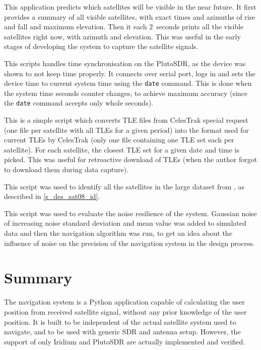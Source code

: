  This application predicts which satellites will be visible in the near future. It first provides a summary of all visible satellites, with exact times and azimuths of rise and fall and maximum elevation. Then it each \qty{2}{seconds} prints all the visible satellites right now, with azimuth and elevation. This was useful in the early stages of developing the system to capture the satellite signals.

 This scripts handles time synchronisation on the PlutoSDR, as the device was shown to not keep time properly. It connects over serial port, logs in and sets the device time to current system time using the \texttt{date} command. This is done when the system time seconds counter changes, to achieve maximum accuracy (since the \texttt{date} command accepts only whole seconds).

 This is a simple script which converts TLE files from CelesTrak special request (one file per satellite with all TLEs for a given period) into the format used for current TLEs by CelesTrak (only one file containing one TLE set each per satellite). For each satellite, the closest TLE set for a given date and time is picked. This was useful for retroactive download of TLEs (when the author forgot to download them during data capture).

 This script was used to identify all the satellites in the large dataset from \cite{sat08}, as described in \autoref{s_des_sat08_id}.

 This script was used to evaluate the noise resilience of the system. Gaussian noise of increasing noise standard deviation and mean value was added to simulated data and then the navigation algorithm was run, to get an idea about the influence of noise on the precision of the navigation system in the design process.

\section{Summary}
The navigation system is a Python application capable of calculating the user position from received satellite signal, without any prior knowledge of the user position. It is built to be independent of the actual satellite system used to navigate, and to be used with generic SDR and antenna setup. However, the support of only Iridium and PlutoSDR are actually implemented and verified.

